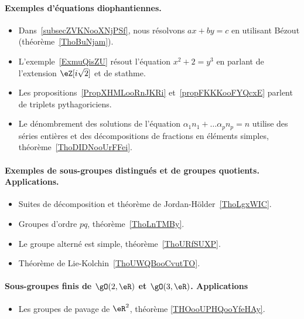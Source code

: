 \paragraph{Exemples d’équations diophantiennes.}
\begin{itemize}
    \item Dans~\ref{subsecZVKNooXNjPSf}, nous résolvons \( ax+by=c\) en utilisant Bézout (théorème~\ref{ThoBuNjam}).
    \item L'exemple~\ref{ExmuQisZU} résout l'équation \( x^2+2=y^3\) en parlant de l'extension \( \eZ[i\sqrt{2}]\) et de stathme.
    \item Les propositions~\ref{PropXHMLooRnJKRi} et~\ref{propFKKKooFYQcxE} parlent de triplets pythagoriciens.
    \item Le dénombrement des solutions de l'équation \( \alpha_1 n_1+\ldots \alpha_pn_p=n\) utilise des séries entières et des décompositions de fractions en éléments simples, théorème~\ref{ThoDIDNooUrFFei}.
\end{itemize}
\paragraph{Exemples de sous-groupes distingués et de groupes quotients. Applications.}
\begin{itemize}
    \item Suites de décomposition et théorème de Jordan-Hölder~\ref{ThoLgxWIC}.
    \item Groupes d'ordre \( pq\), théorème~\ref{ThoLnTMBy}.
    \item Le groupe alterné est simple, théorème~\ref{ThoURfSUXP}.
    \item Théorème de Lie-Kolchin~\ref{ThoUWQBooCvutTO}.
\end{itemize}
\paragraph{Sous-groupes finis de \( \gO(2,\eR)\) et \( \gO(3,\eR)\). Applications}
\begin{itemize}
    \item Les groupes de pavage de \( \eR^2\), théorème \ref{THOooUPHQooYfeHAy}.
\end{itemize}
